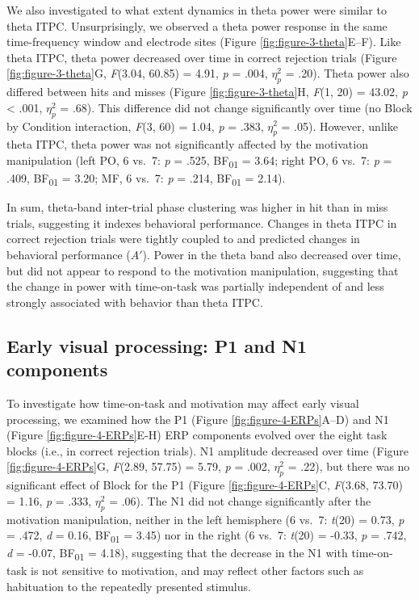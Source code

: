 \documentclass[11pt,english,]{memoir}
\begin{document}
We also investigated to what extent dynamics in theta power were similar to theta ITPC. Unsurprisingly, we observed a theta power response in the same time-frequency window and electrode sites (Figure \ref{fig:figure-3-theta}E--F). Like theta ITPC, theta power decreased over time in correct rejection trials (Figure \ref{fig:figure-3-theta}G, \emph{F}(3.04, 60.85) = 4.91, \emph{p} = .004, \(\eta^2_p\) = .20). Theta power also differed between hits and misses (Figure \ref{fig:figure-3-theta}H, \emph{F}(1, 20) = 43.02, \emph{p} \textless{} .001, \(\eta^2_p\) = .68). This difference did not change significantly over time (no Block by Condition interaction, \emph{F}(3, 60) = 1.04, \emph{p} = .383, \(\eta^2_p\) = .05). However, unlike theta ITPC, theta power was not significantly affected by the motivation manipulation (left PO, 6 vs.~7: \emph{p} = .525, BF\textsubscript{01} = 3.64; right PO, 6 vs.~7: \emph{p} = .409, BF\textsubscript{01} = 3.20; MF, 6 vs.~7: \emph{p} = .214, BF\textsubscript{01} = 2.14).

In sum, theta-band inter-trial phase clustering was higher in hit than in miss trials, suggesting it indexes behavioral performance. Changes in theta ITPC in correct rejection trials were tightly coupled to and predicted changes in behavioral performance (\(A'\)). Power in the theta band also decreased over time, but did not appear to respond to the motivation manipulation, suggesting that the change in power with time-on-task was partially independent of and less strongly associated with behavior than theta ITPC.

\hypertarget{early-visual-processing-p1-and-n1-components}{%
\subsection{Early visual processing: P1 and N1 components}\label{early-visual-processing-p1-and-n1-components}}

To investigate how time-on-task and motivation may affect early visual processing, we examined how the P1 (Figure \ref{fig:figure-4-ERPs}A--D) and N1 (Figure \ref{fig:figure-4-ERPs}E-H) ERP components evolved over the eight task blocks (i.e., in correct rejection trials). N1 amplitude decreased over time (Figure \ref{fig:figure-4-ERPs}G, \emph{F}(2.89, 57.75) = 5.79, \emph{p} = .002, \(\eta^2_p\) = .22), but there was no significant effect of Block for the P1 (Figure \ref{fig:figure-4-ERPs}C, \emph{F}(3.68, 73.70) = 1.16, \emph{p} = .333, \(\eta^2_p\) = .06). The N1 did not change significantly after the motivation manipulation, neither in the left hemisphere (6 vs.~7: \emph{t}(20) = 0.73, \emph{p} = .472, \emph{d} = 0.16, BF\textsubscript{01} = 3.45) nor in the right (6 vs.~7: \emph{t}(20) = -0.33, \emph{p} = .742, \emph{d} = -0.07, BF\textsubscript{01} = 4.18), suggesting that the decrease in the N1 with time-on-task is not sensitive to motivation, and may reflect other factors such as habituation to the repeatedly presented stimulus.
\end{document}
